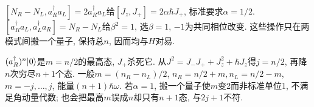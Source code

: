 \begin{solution}
$[N_R-N_L,a_R^\dagger a_L]=2a_R^\dagger a_L$给$[J_z,J_+]=2\alpha\hbar J_+$, 标准要求$\alpha=1/2$. $[a_R^\dagger a_L,a_L^\dagger a_R]=N_R-N_L$给$\beta^2=1$, 选$\beta=1$, $-1$为共同相位改变. 这些操作只在两模式间搬一个量子, 保持总$n$, 因而均与$H$对易.

$(a_R^\dagger)^n\lvert 0\rangle$是$m=n/2$的最高态, $J_+$杀死它. 从$J^2=J_-J_++J_z^2+\hbar J_z$得$j=n/2$, 再降$n$次穷尽$n+1$个态. 一般$m=(n_R-n_L)/2$, $n_R=n/2+m,n_L=n/2-m$, $m=-j,\ldots,j$, 能量$(n+1)\hbar\omega$. 若$\alpha=1$, 搬一个量子使$m$变2而非标准单位1, 不满足角动量代数; 也会把最高$m$误成$n$却只有$n+1$态, 与$2j+1$不符.
\end{solution}

